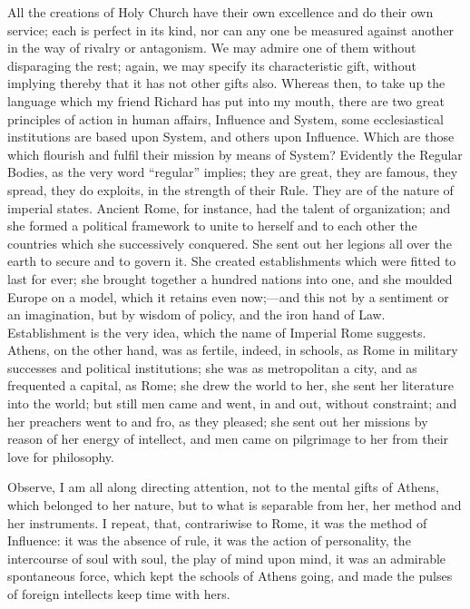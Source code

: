 All the creations of Holy Church have their own excellence and do
their own service; each is perfect in its kind, nor can any one be
measured against another in the way of rivalry or antagonism. We may
admire one of them without disparaging the rest; again, we may specify
its characteristic gift, without implying thereby that it has not
other gifts also. Whereas then, to take up the language which my
friend Richard has put into my mouth, there are two great principles
of action in human affairs, Influence and System, some ecclesiastical
institutions are based upon System, and others upon Influence. Which
are those which flourish and fulfil their mission by means of System?
Evidently the Regular Bodies, as the very word ``regular''
implies; they are great, they are famous, they spread, they do
exploits, in the strength of their Rule. They are of the nature of
imperial states. Ancient Rome, for instance, had the talent of
organization; and she formed a political framework to unite to herself
and to each other the countries which she successively conquered. She
sent out her legions all over the earth to secure and to govern it.
She created establishments which were fitted to last for ever; she
brought together a hundred nations into one, and she moulded Europe on
a model, which it retains even now;—and this not by a sentiment or
an imagination, but by wisdom of policy, and the iron hand of Law.
Establishment is the very idea, which the name of Imperial Rome
suggests. Athens, on the other hand, was as fertile, indeed, in
schools, as Rome in military successes and political institutions; she
was as metropolitan a city, and as frequented a capital, as Rome; she
drew the world to her, she sent her literature into the world; but
still men came and went, in and out, without constraint; and her
preachers went to and fro, as they pleased; she sent out her missions
by reason of her energy of intellect, and men came on pilgrimage to
her from their love for philosophy.

Observe, I am all along directing attention, not to the mental
gifts of Athens, which belonged to her nature, but to what is
separable from her, her method and her instruments. I repeat,
that, contrariwise to Rome, it was the method of Influence: it was the
absence of rule, it was the action of personality, the intercourse of
soul with soul, the play of mind upon mind, it was an admirable
spontaneous force, which kept the schools of Athens going, and made
the pulses of foreign intellects keep time with hers.

